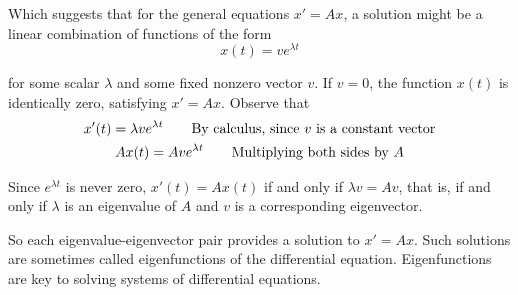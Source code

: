 \documentclass{article}
\begin{document}
  Which suggests that for the general equations $ x'=Ax $, a solution might be a linear combination of functions of the form
  \[
    x(t)=ve^{\lambda t}
  \]

  for some scalar $ \lambda $ and some fixed nonzero vector $ v $. If $ v=0 $, the function $ x(t) $ is identically zero, satisfying $ x'=Ax $. Observe that
  \[
    \begin{gathered}
    x'(t)=\lambda ve^{\lambda t} \qquad \text{By calculus, since $ v $ is a constant vector}\\
    Ax(t)=Ave^{\lambda t} \qquad \text{Multiplying both sides by }A
    \end{gathered}
  \]

  Since $ e^{\lambda t} $ is never zero, $ x'(t) =Ax(t) $ if and only if $ \lambda v=Av $, that is, if and only if $ \lambda $ is an eigenvalue of $ A $ and $ v $ is a corresponding eigenvector.

  So each eigenvalue-eigenvector pair provides a solution to $ x'=Ax $. Such solutions are sometimes called eigenfunctions of the differential equation. Eigenfunctions are key to solving systems of differential equations.
\end{document}
